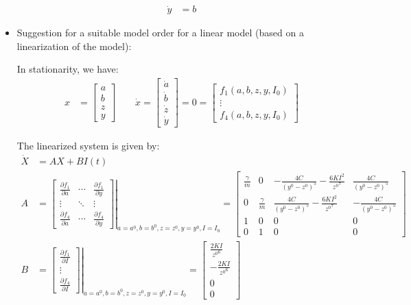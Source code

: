 \documentclass[10pt,a4paper]{article}
\begin{document}
\begin{itemize}
\begin{align*}
		\dot{y} &= b
	\end{align*}
	\item Suggestion for a suitable model order for a linear model (based on a linearization of the model):
	\par In stationarity, we have:
	\begin{align*}
		x &= \begin{bmatrix} a \\ b \\ z \\ y \end{bmatrix} \qquad \dot{x} = \begin{bmatrix} \dot{a} \\ \dot{b} \\ \dot{z} \\ \dot{y} \end{bmatrix} = 0 = \begin{bmatrix} f_{1}(a, b, z, y, I_{0}) \\ \vdots \\ f_{4}(a, b, z, y, I_{0}) \end{bmatrix}
	\end{align*}
	\par The linearized system is given by:
	\begin{align*}
		\dot{X} &= A X + B I(t) \\
		A &= \left. \begin{bmatrix} \frac{\partial f_{1}}{\partial a} & \cdots & \frac{\partial f_{1}}{\partial y} \\ \vdots & \ddots & \vdots \\ \frac{\partial f_{4}}{\partial a} & \cdots & \frac{\partial f_{4}}{\partial y} \end{bmatrix} \right|_{a = a^{0}, b = b^{0}, z = z^{0}, y = y^{0}, I = I_{0}} = \begin{bmatrix} \frac{\gamma}{m} & 0 & - \frac{4 C}{(y^{0} - z^{0})^{5}} - \frac{6 K I^{2}}{{z^{0}}^{7}} & \frac{4 C}{(y^{0} - z^{0})^{5}} \\ 0 & \frac{\gamma}{m} & \frac{4 C}{(y^{0} - z^{0})^{5}} - \frac{6 K I^{2}}{{z^{0}}^{7}} & - \frac{4 C}{(y^{0} - z^{0})^{5}} \\ 1 & 0 & 0 & 0 \\ 0 & 1 & 0 & 0 \end{bmatrix} \\ 
		B &= \left. \begin{bmatrix} \frac{\partial f_{1}}{\partial I} \\ \vdots \\ \frac{\partial f_{4}}{\partial I} \end{bmatrix} \right|_{a = a^{0}, b = b^{0}, z = z^{0}, y = y^{0}, I = I_{0}} = \begin{bmatrix} \frac{2 K I}{{z^{0}}^{6}} \\ - \frac{2 K I}{{z^{0}}^{6}} \\ 0 \\ 0 \end{bmatrix}

\end{align*}
\end{itemize}
\end{document}
